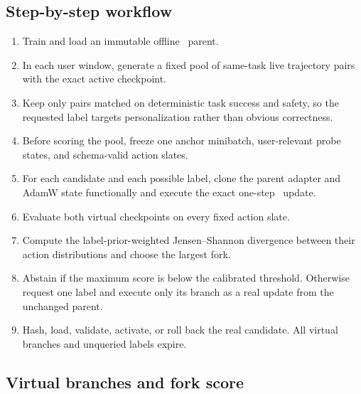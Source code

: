 \subsection{Step-by-step workflow}

\begin{enumerate}
  \item Train and load an immutable offline \prlhf\ parent.
  \item In each user window, generate a fixed pool of same-task live trajectory
  pairs with the exact active checkpoint.
  \item Keep only pairs matched on deterministic task success and safety, so
  the requested label targets personalization rather than obvious correctness.
  \item Before scoring the pool, freeze one anchor minibatch, user-relevant
  probe states, and schema-valid action slates.
  \item For each candidate and each possible label, clone the parent adapter
  and AdamW state functionally and execute the exact one-step \pdpo\ update.
  \item Evaluate both virtual checkpoints on every fixed action slate.
  \item Compute the label-prior-weighted Jensen--Shannon divergence between
  their action distributions and choose the largest fork.
  \item Abstain if the maximum score is below the calibrated threshold.
  Otherwise request one label and execute only its branch as a real update from
  the unchanged parent.
  \item Hash, load, validate, activate, or roll back the real candidate.  All
  virtual branches and unqueried labels expire.
\end{enumerate}

\subsection{Virtual branches and fork score}


